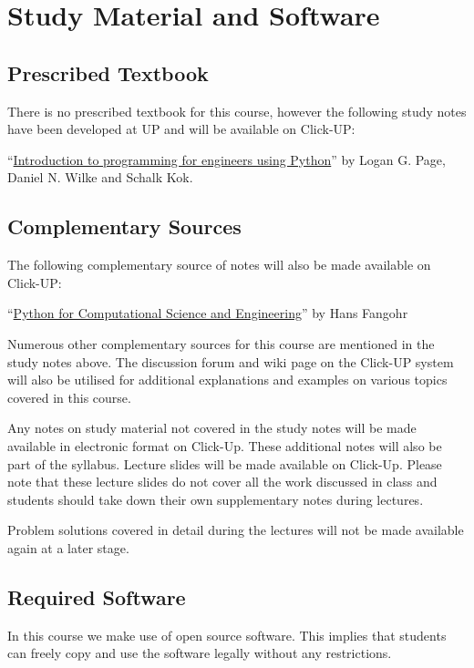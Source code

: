 \section{Study Material and Software}
    \subsection{Prescribed Textbook}
        There is no prescribed textbook for this course, however the following
        study notes have been developed at UP and will be available on Click-UP:

        ``\underline{Introduction to programming for engineers using Python}''
        by Logan G. Page, Daniel N. Wilke and Schalk Kok.

    \subsection{Complementary Sources}
        The following complementary source of notes will also be made available
        on Click-UP:

        ``\underline{Python for Computational Science and Engineering}'' by
        Hans Fangohr

        Numerous other complementary sources for this course are mentioned in
        the study notes above. The discussion forum and wiki page on the
        Click-UP system will also be utilised for additional explanations and
        examples on various topics covered in this course.

        Any notes on study material not covered in the study notes will be made
        available in electronic format on Click-Up. These additional notes will
        also be part of the syllabus. Lecture slides will be made available on
        Click-Up. Please note that these lecture slides do not cover all the
        work discussed in class and students should take down their own
        supplementary notes during lectures.

        Problem solutions covered in detail during the lectures will not be
        made available again at a later stage.

    \subsection{Required Software}
        In this course we make use of open source software. This implies
        that students can freely copy and use the software legally
        without any restrictions.

